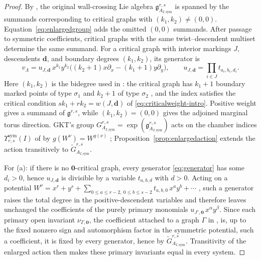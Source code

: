 \documentclass[11pt]{amsart}
\theoremstyle{definition}
\theoremstyle{remark}
\newcommand{\gfrak}{\mathfrak{g}}
\begin{document}
\begin{proof}
By \cite[Definition~4.23]{GKT}, the original wall-crossing Lie algebra
$\gfrak^{r,s}_{A_{I,\mathrm{sym}}}$ is spanned by the summands
corresponding to critical graphs with $(k_{1},k_{2})\ne(0,0)$.
Equation~\eqref{eq:enlargedgroup} adds the omitted $(0,0)$ summands. After passage
to symmetric coefficients, critical graphs with the same twist--descendent
multiset determine the same summand. For a critical graph with interior
markings $J$, descendents $\mathbf d$, and boundary degrees
$(k_{1},k_{2})$, its generator is
\begin{equation}
\label{eq:generator}
v_{\Lambda}=u_{J,\mathbf d}\,x^{k_{1}}y^{k_{2}}
\bigl((k_{2}+1)x\partial_{x}-(k_{1}+1)y\partial_{y}\bigr),\qquad
u_{J,\mathbf d}=\prod_{i\in J}t_{a_{i},b_{i},d_{i}} .
\end{equation}
Here $(k_{1},k_{2})$ is the bidegree used in
\cite[Definition~4.23]{GKT}: the critical graph has $k_{1}{+}1$ boundary
marked points of type $\sigma_{1}$ and $k_{2}{+}1$ of type $\sigma_{2}$
\cite[eqn.~(2.31), Proposition~2.39]{GKT}, and
the index satisfies the critical condition
$sk_{1}+rk_{2}=w(J,\mathbf d)$ of \eqref{eq:criticalweight-intro}. Positive
weight gives a summand of $\gfrak^{r,s}$, while $(k_{1},k_{2})=(0,0)$ gives the
adjoined marginal torus direction. GKT's group
$G^{r,s}_{A_{I,\mathrm{sym}}}=\exp(\gfrak^{r,s}_{A_{I,\mathrm{sym}}})$ acts on
the chamber indices $\Upsilon^{\mathrm{sym}}_{r,s}(I)$ of
\cite[Definition~3.47]{GKT} by
$g(W^{\nu})=W^{g(\nu)}$ \cite[Theorem~4.27]{GKT};
Proposition~\ref{prop:enlargedaction} extends the action transitively to
$\widetilde G^{r,s}_{A_{I,\mathrm{sym}}}$.

For (a): if there is no $\mathbf0$-critical graph, every generator
\eqref{eq:generator} has some $d_{i}>0$, hence $u_{J,\mathbf d}$ is divisible by
a variable $t_{a,b,d}$ with $d>0$. Acting on a potential
$W^{\nu}=x^{r}+y^{s}+\sum_{0\le a\le r-2,\ 0\le b\le s-2}t_{a,b,0}\,x^{a}y^{b}+\cdots$
\cite[eqn.~(0.5)]{GKT}, such a generator raises the total degree in the
positive-descendent variables and therefore leaves unchanged the coefficients of
the purely primary monomials $u_{J',\mathbf 0}\,x^{\alpha}y^{\beta}$. Since
each primary open invariant $\nu_{\Gamma,\mathbf 0}$, the coefficient attached
to a graph $\Gamma$ in \cite[eqns.~(0.4)--(0.5)]{GKT}, is, up to the fixed
nonzero sign and automorphism factor in the symmetric potential, such a
coefficient, it is fixed by every generator, hence by
$\widetilde G^{r,s}_{A_{I,\mathrm{sym}}}$. Transitivity of the enlarged action
then makes these primary invariants equal in every system.


\end{proof}
\end{document}
